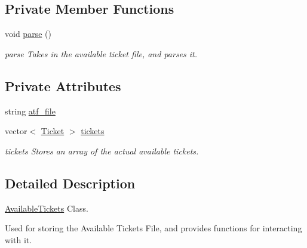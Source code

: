 \subsection*{Private Member Functions}
\begin{DoxyCompactItemize}
\item 
void \hyperlink{class_available_tickets_ad7c704b34912678d95c13243cacf9d7f}{parse} ()
\begin{DoxyCompactList}\small\item\em parse Takes in the available ticket file, and parses it. \end{DoxyCompactList}\end{DoxyCompactItemize}
\subsection*{Private Attributes}
\begin{DoxyCompactItemize}
\item 
string \hyperlink{class_available_tickets_ad677bc95025de980a4144bcf63e5b4ba}{atf\-\_\-file}
\item 
vector$<$ \hyperlink{class_ticket}{Ticket} $>$ \hyperlink{class_available_tickets_ad50ec5da3cb7e33f97d6ed07e362a50a}{tickets}
\begin{DoxyCompactList}\small\item\em tickets Stores an array of the actual available tickets. \end{DoxyCompactList}\end{DoxyCompactItemize}


\subsection{Detailed Description}
\hyperlink{class_available_tickets}{Available\-Tickets} Class. 

Used for storing the Available Tickets File, and provides functions for interacting with it. 

